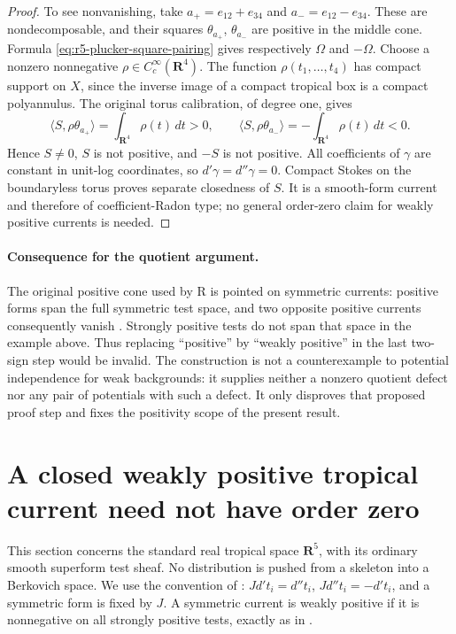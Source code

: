 \documentclass[11pt,a4paper]{article}
\numberwithin{equation}{section}
\theoremstyle{definition}
\theoremstyle{remark}
\begin{document}
\begin{proof}
To see nonvanishing, take
$a_+=e_{12}+e_{34}$ and $a_-=e_{12}-e_{34}$.
These are nondecomposable, and their squares $\theta_{a_+}$,
$\theta_{a_-}$ are positive in the middle cone.  Formula
\eqref{eq:r5-plucker-square-pairing} gives respectively
$\Omega$ and $-\Omega$.  Choose a nonzero nonnegative
$\rho\in C_c^\infty(\mathbf R^4)$.  The function
$\rho(t_1,\ldots,t_4)$ has compact support on $X$, since
the inverse image of a compact tropical box is a compact
polyannulus.  The original torus calibration, of degree one,
gives
\[
 \langle S,\rho\theta_{a_+}\rangle
                   =\int_{\mathbf R^4}\rho(t)\,dt>0,
 \qquad
 \langle S,\rho\theta_{a_-}\rangle
                   =-\int_{\mathbf R^4}\rho(t)\,dt<0.
\]
Hence $S\ne0$, $S$ is not positive, and $-S$ is not positive.
All coefficients of $\gamma$ are constant in unit-log
coordinates, so $d'\gamma=d''\gamma=0$.  Compact Stokes on
the boundaryless torus proves separate closedness of $S$.
It is a smooth-form current and therefore of coefficient-Radon
type; no general order-zero claim for weakly positive currents
is needed.
\end{proof}

\paragraph{Consequence for the quotient argument.}
The original positive cone used by R is pointed on symmetric
currents: positive forms span the full symmetric test space,
and two opposite positive currents consequently vanish
\cite[Remark 7.2.3]{CLD25}.  Strongly positive tests do not
span that space in the example above.  Thus replacing
``positive'' by ``weakly positive'' in the last two-sign step
would be invalid.  The construction is not a counterexample
to potential independence for weak backgrounds: it supplies
neither a nonzero quotient defect nor any pair of potentials
with such a defect.  It only disproves that proposed proof
step and fixes the positivity scope of the present result.



\section{A closed weakly positive tropical current need not have order zero}
\label{sec:r5-weak-order-zero-tropical}

This section concerns the standard real tropical space $\mathbf R^5$,
with its ordinary smooth superform test sheaf.  No distribution is
pushed from a skeleton into a Berkovich space.  We use the convention
of \cite[\S 1.1.2]{CLD25}: $Jd't_i=d''t_i$,
$Jd''t_i=-d't_i$, and a symmetric form is fixed by $J$.
A symmetric current is weakly positive if it is nonnegative on all
strongly positive tests, exactly as in
\cite[Definition 7.2.1]{CLD25}.
\end{document}

